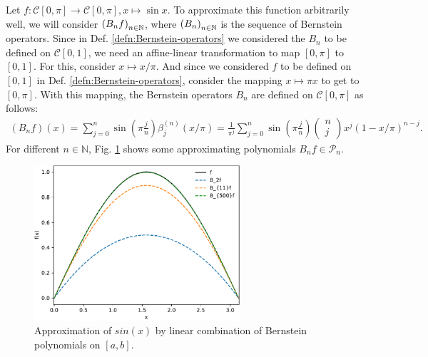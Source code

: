 \begin{exmp}
	Let $f:\mathcal C[0, \pi]\to\mathcal C[0, \pi], x\mapsto \sin x$. To approximate this function arbitrarily well, we will consider $\seq[B_nf]$, where $\seq[B_n]$ is the sequence of Bernstein operators. Since in Def. \ref{defn:Bernstein-operators} we considered the $B_n$ to be defined on $\mathcal C[0, 1]$, we need an affine-linear transformation to map $[0, \pi]$ to $[0, 1]$. For this, consider $x\mapsto x/\pi$. And since we considered $f$ to be defined on $[0, 1]$ in Def. \ref{defn:Bernstein-operators}, consider the mapping $x\mapsto \pi x$ to get to $[0, \pi]$. With this mapping, the Bernstein operators $B_n$ are defined on $\mathcal C[0, \pi]$ as follows:
	\begin{align}
		(B_nf)(x) = \sum_{j=0}^{n}\sin\left(\pi\frac{j}{n}\right)\beta_{j}^{(n)}(x/\pi) = \frac{1}{\pi^j}\sum_{j=0}^{n}\sin\left(\pi\frac{j}{n}\right)\begin{pmatrix}n\\ j\end{pmatrix} x^j(1-x/\pi)^{n-j}.
	\end{align}
	For different $n\in\mathbb N$, Fig. \ref{fig:sine_approx} shows some approximating polynomials $B_nf\in\mathcal P_n$.
	
	\begin{figure}[h!]
		\centering 
		\includegraphics[width=0.68\textwidth]{scripts/approximation_sine.pdf}
		\caption{Approximation of $sin(x)$ by linear combination of Bernstein polynomials on $[a, b]$.}
		\label{fig:sine_approx}
	\end{figure}
\end{exmp}

